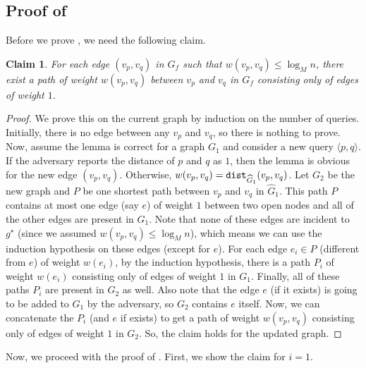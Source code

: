 \documentclass[11pt]{article}
\newcommand{\1}{\mathmybb{1}}
\newtheorem{claim}[theorem]{Claim}
\newcommand{\dist}{\textnormal{\texttt{dist}}}
\begin{document}
\subsection{Proof of }\label{sec:bound-on-neighbors}

Before we prove , we need the following claim.

\begin{claim}\label{lem:path-of-length-1-edges}
    For each edge $(v_p,v_q)$ in $G_f$ such that $w(v_p,v_q) \leq \log_M n$, there exist a path of weight $w(v_p,v_q)$ between $v_p$ and $v_q$ in $G_f$ consisting only of edges of weight $1$.
\end{claim}


\begin{proof}
    We prove this on the current graph by induction on the number of queries. 
    Initially, there is no edge between any $v_p$ and $v_q$, so there is nothing to prove.
    Now, assume the lemma is correct for a graph $G_1$ and consider a new query $ \langle p,q \rangle$.
    If the adversary reports the distance of $p$ and $q$ as $1$, then the lemma is obvious for the new edge $(v_p, v_q)$.
    Otherwise, $w(v_p,v_q) = \dist_{\widehat G_1}(v_p,v_q)$.
    Let $G_2$ be the new graph and
    $P$ be one shortest path between $v_p$ and $v_q$ in $\widehat G_1$.
    This path $P$ contains at most one edge (say $e$) of weight $1$ between two open nodes and all of the other edges are present in $G_1$.
    Note that none of these edges are incident to $g^\star$ (since we assumed $w(v_p,v_q) \leq \log_M n$), which means we can use the induction hypothesis on these edges (except for $e$).
    For each edge $e_i \in P$ (different from $e$) of weight $w(e_i)$, by the induction hypothesis, there is a path $P_i$ of weight $w(e_i)$ consisting only of edges of weight $1$ in $G_1$.
    Finally, all of these paths $P_i$ are present in $G_2$ as well.
    Also note that the edge $e$ (if it exists) is going to be added to $G_1$ by the adversary, so $G_2$ contains $e$ itself.
    Now, we can concatenate the $P_i$ (and $e$ if exists) to get a path of weight $w(v_p,v_q)$ consisting only of edges of weight $1$ in $G_2$.
    So, the claim holds for the updated graph.
\end{proof}


Now, we proceed with the proof of .
First, we show the claim for $i = 1$.
\end{document}
